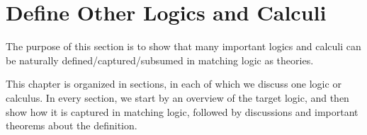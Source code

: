 \chapter{Define Other Logics and Calculi}


The purpose of this section is to show that
many important logics and calculi can be naturally
defined/captured/subsumed
in matching logic as theories.

This chapter is organized in sections,
in each of which we discuss one logic or calculus.
In every section, we start by an overview of the
target logic, and then show how it is captured in
matching logic, followed by discussions and important
theorems about the definition.






